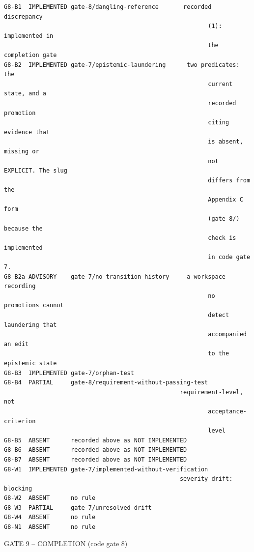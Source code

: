 \documentclass[11pt,a4paper]{article}
\begin{document}
\begin{Verbatim}[fontsize=\footnotesize,breaklines=true,breakanywhere=true,breakautoindent=false,samepage=false]
G8-B1  IMPLEMENTED gate-8/dangling-reference       recorded discrepancy
                                                          (1): implemented in
                                                          the completion gate
G8-B2  IMPLEMENTED gate-7/epistemic-laundering      two predicates: the
                                                          current state, and a
                                                          recorded promotion
                                                          citing evidence that
                                                          is absent, missing or
                                                          not EXPLICIT. The slug
                                                          differs from the
                                                          Appendix C form
                                                          (gate-8/) because the
                                                          check is implemented
                                                          in code gate 7.
G8-B2a ADVISORY    gate-7/no-transition-history     a workspace recording
                                                          no promotions cannot
                                                          detect laundering that
                                                          accompanied an edit
                                                          to the epistemic state
G8-B3  IMPLEMENTED gate-7/orphan-test
G8-B4  PARTIAL     gate-8/requirement-without-passing-test
                                                  requirement-level, not
                                                          acceptance-criterion
                                                          level
G8-B5  ABSENT      recorded above as NOT IMPLEMENTED
G8-B6  ABSENT      recorded above as NOT IMPLEMENTED
G8-B7  ABSENT      recorded above as NOT IMPLEMENTED
G8-W1  IMPLEMENTED gate-7/implemented-without-verification
                                                  severity drift: blocking
G8-W2  ABSENT      no rule
G8-W3  PARTIAL     gate-7/unresolved-drift
G8-W4  ABSENT      no rule
G8-N1  ABSENT      no rule
\end{Verbatim}

GATE 9 -- COMPLETION (code gate 8)
\end{document}
